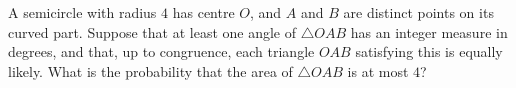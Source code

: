 A semicircle with radius $4$ has centre $O$, and $A$ and $B$ are distinct points on its curved part. Suppose that at least one angle of $\triangle OAB$ has an integer measure in degrees, and that, up to congruence, each triangle $OAB$ satisfying this is equally likely. What is the probability that the area of $\triangle OAB$ is at most $4$?
